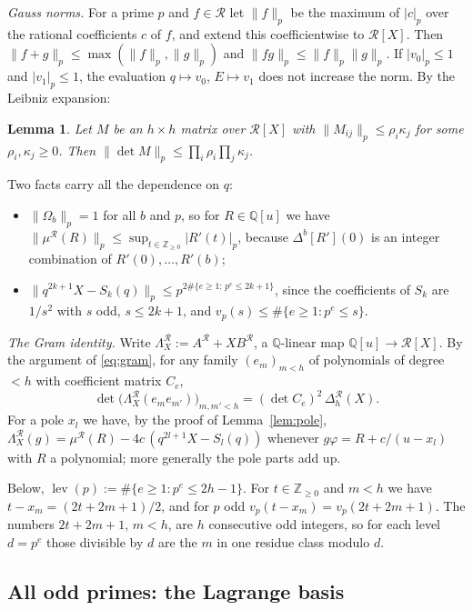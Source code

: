 \documentclass[11pt]{amsart}
\newtheorem{lemma}[theorem]{Lemma}
\theoremstyle{definition}
\theoremstyle{remark}
\numberwithin{equation}{section}
\newcommand{\ZZ}{\mathbb{Z}}
\newcommand{\QQ}{\mathbb{Q}}
\newcommand{\cR}{\mathcal{R}}
\newcommand{\lev}{\operatorname{lev}}
\begin{document}
\emph{Gauss norms.} For a prime $p$ and $f\in\cR$ let $\|f\|_p$ be the maximum of $|c|_p$ over the rational
coefficients $c$ of $f$, and extend this coefficientwise to $\cR[X]$. Then $\|f+g\|_p\le\max(\|f\|_p,\|g\|_p)$ and
$\|fg\|_p\le\|f\|_p\|g\|_p$. If $|v_0|_p\le1$ and $|v_1|_p\le1$, the evaluation $q\mapsto v_0$, $E\mapsto v_1$
does not increase the norm. By the Leibniz expansion:

\begin{lemma}\label{lem:leibniz}
Let $M$ be an $h\times h$ matrix over $\cR[X]$ with $\|M_{ij}\|_p\le\rho_i\kappa_j$ for some $\rho_i,\kappa_j\ge0$. Then
$\|\det M\|_p\le\prod_i\rho_i\prod_j\kappa_j$.
\end{lemma}

Two facts carry all the dependence on $q$:
\begin{itemize}
\item[(F1)] $\|\Omega_b\|_p=1$ for all $b$ and $p$, so for $R\in\QQ[u]$ we have
  $\|\mu^{\cR}(R)\|_p\le\sup_{t\in\ZZ_{\ge0}}|R'(t)|_p$, because $\Delta^b[R'](0)$ is an integer combination of
  $R'(0),\dots,R'(b)$;
\item[(F2)] $\|q^{2k+1}X-S_k(q)\|_p\le p^{2\#\{e\ge1:\,p^e\le2k+1\}}$, since the coefficients of $S_k$ are $1/s^2$
  with $s$ odd, $s\le2k+1$, and $v_p(s)\le\#\{e\ge1:p^e\le s\}$.
\end{itemize}

\emph{The Gram identity.} Write $\Lambda^{\cR}_X:=A^{\cR}+XB^{\cR}$, a $\QQ$-linear map $\QQ[u]\to\cR[X]$. By the argument
of \eqref{eq:gram}, for any family $(e_m)_{m<h}$ of polynomials of degree $<h$ with coefficient matrix $C_e$,
\begin{equation}\label{eq:gramR}
  \det\bigl(\Lambda^{\cR}_X(e_me_{m'})\bigr)_{m,m'<h}=(\det C_e)^2\,\Delta^{\cR}_h(X).
\end{equation}
For a pole $x_l$ we have, by the proof of Lemma~\ref{lem:pole}, $\Lambda^{\cR}_X(g)=\mu^{\cR}(R)-4c\,(q^{2l+1}X-S_l(q))$
whenever $g\varphi=R+c/(u-x_l)$ with $R$ a polynomial; more generally the pole parts add up.

Below, $\lev(p):=\#\{e\ge1:p^e\le2h-1\}$. For $t\in\ZZ_{\ge0}$ and $m<h$ we have $t-x_m=(2t+2m+1)/2$, and for $p$ odd
$v_p(t-x_m)=v_p(2t+2m+1)$. The numbers $2t+2m+1$, $m<h$, are $h$ consecutive odd integers, so for each level
$d=p^e$ those divisible by $d$ are the $m$ in one residue class modulo $d$.

\subsection{All odd primes: the Lagrange basis}
\end{document}
